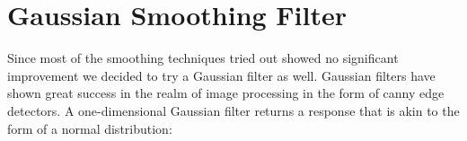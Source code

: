 \section{Gaussian Smoothing Filter}
\label{sec:eval:GSF}
Since most of the smoothing techniques tried out showed no significant improvement we decided to try a Gaussian filter as well. Gaussian filters have shown great success in the realm of image processing in the form of canny edge detectors. 
A one-dimensional Gaussian filter returns a response that is akin to the form of a normal distribution:

